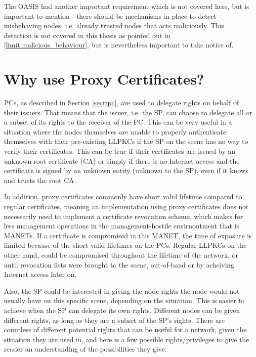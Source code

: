 The OASIS had another important requirement which is not covered here, but is
important to mention - there should be mechanisms in place to detect misbehaving
nodes, i.e. already trusted nodes that acts maliciously. This detection is not
covered in this thesis as pointed out in \ref{limit:malicious_behaviour}, but is
nevertheless important to take notice of.

\section{Why use Proxy Certificates?}
\acp{PC}, as described in Section \ref{sect:pc}, are used to delegate
rights on behalf of their issuers. That means that the issuer, i.e. the \ac{SP},
can choose to delegate all or a subset of its rights to the receiver of the
\ac{PC}. This can be very useful in a situation where the nodes themselves are
unable to properly authenticate themselves with their pre-existing \acp{LLPKC}
if the \ac{SP} on the scene has no way to verify their certificates. This can be
true if their certificates are issued by an unknown root certificate (\ac{CA})
or simply if there is no Internet access and the certificate is signed by an
unknown entity (unknown to the \ac{SP}), even if it knows and trusts the root
\ac{CA}. 

In addition, proxy certificates commonly have short valid lifetime compared to
regular certificates, meaning an implementation using proxy certificates does
not necessarily need to implement a certificate revocation scheme, which makes
for less management operations in the management-hostile envirnontment that is
\acp{MANET}. If a certificate is compromised in this \ac{MANET}, the time of
exposure is limited because of the short valid lifetimes on the \acp{PC}.
Regular \acp{LLPKC} on the other hand, could be compromised throughout the
lifetime of the network, or until revocation lists were brought to the scene,
out-of-band or by acheiving Internet access later on.

Also, the \ac{SP} could be interested in giving the node rights the node would
not usually have on this specific scene, depending on the situation. This is
easier to achieve when the \ac{SP} can delegate its own rights. Different nodes
can be given different rights, as long as they are a subset of the SP's rights.
There are countless of different potential rights that can be useful for a
network, given the situation they are used in, and here is a few possible
rights/privileges to give the reader an understanding of the possibilities they
give:

